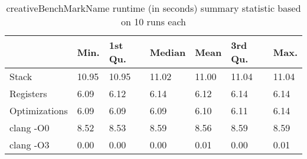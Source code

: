 \begin{table}[h!]
\centering
\begin{tabular}{p{}p{}p{}p{}p{}p{}p{}}
  \hline
 & Min. & 1st Qu. & Median & Mean & 3rd Qu. & Max. \\ 
  \hline
Stack & 10.95 & 10.95 & 11.02 & 11.00 & 11.04 & 11.04 \\ 
  Registers & 6.09 & 6.12 & 6.14 & 6.12 & 6.14 & 6.14 \\ 
  Optimizations & 6.09 & 6.09 & 6.09 & 6.10 & 6.11 & 6.14 \\ 
  clang -O0 & 8.52 & 8.53 & 8.59 & 8.56 & 8.59 & 8.59 \\ 
  clang -O3 & 0.00 & 0.00 & 0.00 & 0.01 & 0.00 & 0.01 \\ 
   \hline
\end{tabular}
\caption{creativeBenchMarkName runtime (in seconds) summary statistic based on 10 runs each}
\end{table}
